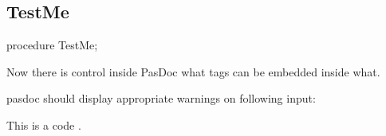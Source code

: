 \documentclass{report}
\newif\ifpdf
\begin{document}
\subsection*{TestMe}
\fi
\label{warning_incorrect_tag_nesting-TestMe}
\begin{list}{}{
\setlength{\itemindent}{0cm}
\setlength{\listparindent}{0cm}
\setlength{\leftmargin}{\evensidemargin}
\addtolength{\leftmargin}{\tmplength}
\settowidth{\labelsep}{X}
\addtolength{\leftmargin}{\labelsep}
\setlength{\labelwidth}{\tmplength}
}
\item[\textbf{Declaration}\hfill]
\ifpdf
\begin{flushleft}
\fi
\begin{ttfamily}
procedure TestMe;\end{ttfamily}

\ifpdf
\end{flushleft}
\fi

\par
\item[\textbf{Description}]
Now there is control inside PasDoc what tags can be embedded inside what.

pasdoc should display appropriate warnings on following input:

\begin{ttfamily}This is a code .\end{ttfamily}

 



\par
\item[\textbf{Exceptions}]
\begin{description}
\item[\begin{ttfamily}EFoo\end{ttfamily}(\ref{warning_incorrect_tag_nesting.EFoo})] 
\end{description}


\end{list}
\end{document}
